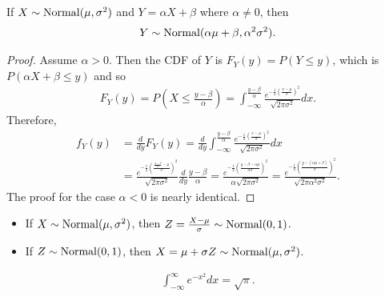 \begin{thm}
    If $X \sim \mathrm{Normal}(\mu, \sigma^2)$ and $Y = \alpha X + \beta$ where $\alpha \neq 0$, then
    \begin{align*}
        Y \sim \mathrm{Normal}(\alpha\mu + \beta, \alpha^2\sigma^2).
    \end{align*}
\end{thm}

\begin{proof}
    Assume $\alpha > 0$. Then the CDF of $Y$ is $F_Y(y) = P(Y \leq y)$, which is $P(\alpha X + \beta \leq y)$ and so
    \begin{align*}
        F_Y(y) = P\left(X \leq \frac{y - \beta}{\alpha}\right) = \int_{-\infty}^{\frac{y-\beta}{\alpha}}\frac{e^{-\frac{1}{2}\left(\frac{x - \mu}{\sigma}\right)^2}}{\sqrt{2\pi\sigma^2}}dx.
    \end{align*}
    Therefore,
    \begin{align*}
        f_Y(y) &= \frac{d}{dy}F_Y(y) = \frac{d}{dy}\int_{-\infty}^{\frac{y-\beta}{\alpha}}\frac{e^{-\frac{1}{2}\left(\frac{x - \mu}{\sigma}\right)^2}}{\sqrt{2\pi\sigma^2}}dx \\
        &= \frac{e^{-\frac{1}{2}\left(\frac{\frac{y-\beta}{\alpha} - \mu}{\sigma}\right)^2}}{\sqrt{2\pi\sigma^2}}\frac{d}{dy}\frac{y - \beta}{\alpha} = \frac{e^{-\frac{1}{2}\left(\frac{y - \beta - \alpha\mu}{\alpha\sigma}\right)^2}}{\alpha\sqrt{2\pi\sigma^2}} = \frac{e^{-\frac{1}{2}\left(\frac{y - \left(\alpha\mu + \beta\right)}{\sigma}\right)^2}}{\sqrt{2\pi\alpha^2\sigma^2}}.
    \end{align*}
    The proof for the case $\alpha < 0$ is nearly identical.
\end{proof}

\begin{cor}\proofbreak
    \begin{itemize}
        \item If $X \sim \mathrm{Normal}(\mu, \sigma^2)$, then $Z = \frac{X - \mu}{\sigma} \sim \mathrm{Normal}(0, 1)$.
        \item If $Z \sim \mathrm{Normal}(0, 1)$, then $X = \mu + \sigma Z \sim \mathrm{Normal}(\mu, \sigma^2)$.
    \end{itemize}
\end{cor}

\begin{lemma}\label{gaussian-integral}
    \begin{align*}
        \int_{-\infty}^{\infty}e^{-x^2}dx = \sqrt{\pi}.
    \end{align*}
\end{lemma}

